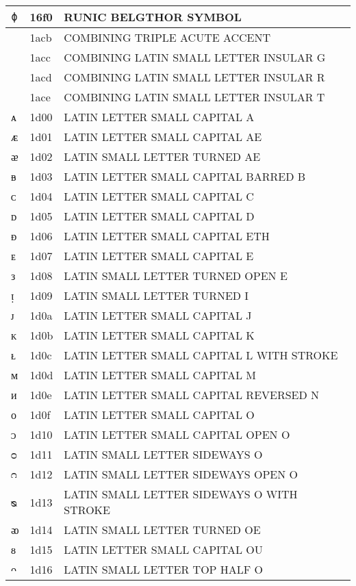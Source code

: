 \documentclass[12pt,letterpaper,openany]{book}
\begin{document}
\begin{center}
\begin{supertabular}{|m{0.25in}|m{0.5in}|m{4in}|}
			ᛰ & 16f0 & RUNIC BELGTHOR SYMBOL\\\hline
			◌᫋ & 1acb & COMBINING TRIPLE ACUTE ACCENT\\\hline
			◌ᫌ & 1acc & COMBINING LATIN SMALL LETTER INSULAR G\\\hline
			◌ᫍ & 1acd & COMBINING LATIN SMALL LETTER INSULAR R\\\hline
			◌ᫎ & 1ace & COMBINING LATIN SMALL LETTER INSULAR T\\\hline
			ᴀ & 1d00 & LATIN LETTER SMALL CAPITAL A\\\hline
			ᴁ & 1d01 & LATIN LETTER SMALL CAPITAL AE\\\hline
			ᴂ & 1d02 & LATIN SMALL LETTER TURNED AE\\\hline
			ᴃ & 1d03 & LATIN LETTER SMALL CAPITAL BARRED B\\\hline
			ᴄ & 1d04 & LATIN LETTER SMALL CAPITAL C\\\hline
			ᴅ & 1d05 & LATIN LETTER SMALL CAPITAL D\\\hline
			ᴆ & 1d06 & LATIN LETTER SMALL CAPITAL ETH\\\hline
			ᴇ & 1d07 & LATIN LETTER SMALL CAPITAL E\\\hline
			ᴈ & 1d08 & LATIN SMALL LETTER TURNED OPEN E\\\hline
			ᴉ & 1d09 & LATIN SMALL LETTER TURNED I\\\hline
			ᴊ & 1d0a & LATIN LETTER SMALL CAPITAL J\\\hline
			ᴋ & 1d0b & LATIN LETTER SMALL CAPITAL K\\\hline
			ᴌ & 1d0c & LATIN LETTER SMALL CAPITAL L WITH STROKE\\\hline
			ᴍ & 1d0d & LATIN LETTER SMALL CAPITAL M\\\hline
			ᴎ & 1d0e & LATIN LETTER SMALL CAPITAL REVERSED N\\\hline
			ᴏ & 1d0f & LATIN LETTER SMALL CAPITAL O\\\hline
			ᴐ & 1d10 & LATIN LETTER SMALL CAPITAL OPEN O\\\hline
			ᴑ & 1d11 & LATIN SMALL LETTER SIDEWAYS O\\\hline
			ᴒ & 1d12 & LATIN SMALL LETTER SIDEWAYS OPEN O\\\hline
			ᴓ & 1d13 & LATIN SMALL LETTER SIDEWAYS O WITH STROKE\\\hline
			ᴔ & 1d14 & LATIN SMALL LETTER TURNED OE\\\hline
			ᴕ & 1d15 & LATIN LETTER SMALL CAPITAL OU\\\hline
			ᴖ & 1d16 & LATIN SMALL LETTER TOP HALF O\\\hline

\end{supertabular}
\end{center}
\end{document}
